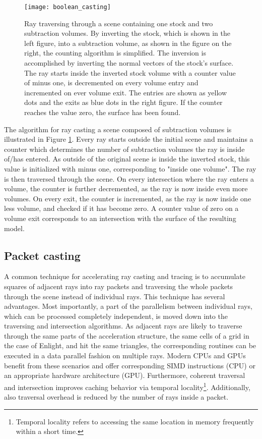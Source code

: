 \begin{figure}
\centering
\texttt{[image: boolean\_casting]}
\caption{Ray traversing through a scene containing one stock and two subtraction volumes. By inverting the stock, which is shown in the left figure, into a subtraction volume, as shown in the figure on the right, the counting algorithm is simplified. The inversion is accomplished by inverting the normal vectors of the stock's surface. The ray starts inside the inverted stock volume with a counter value of minus one, is decremented on every volume entry and incremented on ever volume exit. The entries are shown as yellow dots and the exits as blue dots in the right figure. If the counter reaches the value zero, the surface has been found.}
\label{fig:boolean_casting} 
\end{figure}

The algorithm for ray casting a scene composed of subtraction volumes is illustrated in Figure \ref{fig:boolean_casting}. Every ray starts outside the initial scene and maintains a counter which determines the number of subtraction volumes the ray is inside of/has entered. As outside of the original scene is inside the inverted stock, this value is initialized with minus one, corresponding to "inside one volume". The ray is then traversed through the scene. On every intersection where the ray enters a volume, the counter is further decremented, as the ray is now inside even more volumes. On every exit, the counter is incremented, as the ray is now inside one less volume, and checked if it has become zero. A counter value of zero on a volume exit corresponds to an intersection with the surface of the resulting model.

\subsection{Packet casting}
\label{sec:packet_casting}

A common technique for accelerating ray casting and tracing is to accumulate squares of adjacent rays into ray packets and traversing the whole packets through the scene instead of individual rays. This technique has several advantages. Most importantly, a part of the parallelism between individual rays, which can be processed completely independent, is moved down into the traversing and intersection algorithms. As adjacent rays are likely to traverse through the same parts of the acceleration structure, the same cells of a grid in the case of Enlight, and hit the same triangles, the corresponding routines can be executed in a data parallel fashion on multiple rays. Modern CPUs and GPUs benefit from these scenarios and offer corresponding SIMD instructions (CPU) or an appropriate hardware architecture (GPU). Furthermore, coherent traversal and intersection improves caching behavior via temporal locality\footnote{Temporal locality refers to accessing the same location in memory frequently within a short time.}. Additionally, also traversal overhead is reduced by the number of rays inside a packet.

